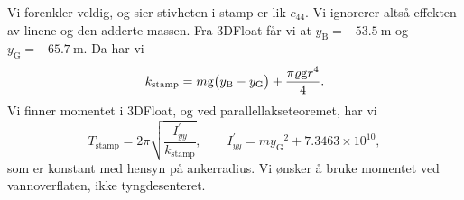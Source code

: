 Vi forenkler veldig, og sier stivheten i stamp er lik $c_{44}$.
Vi ignorerer altså effekten av linene og den adderte massen.
Fra 3DFloat får vi at $y_{\mathrm{B}} = \SI{-53.5}{\meter}$ og $y_{\mathrm{G}} = \SI{-65.7}{\meter}$.
Da har vi
\[
k_{\mathrm{stamp}} = m\mathrm{g} \big( y_{\mathrm{B}} - y_{\mathrm{G}} \big) + \frac{\pi\varrho\mathrm{g} r^4}{4}.
\]
Vi finner momentet i 3DFloat, og ved parallellakseteoremet, har vi
\[
T_{\mathrm{stamp}} = 2\pi\sqrt{\frac{I_{yy}^{\prime}}{k_{\mathrm{stamp}}}}, \qquad I_{yy}^{\prime} = m {y_{\mathrm{G}}}^2 + 7.3463\times10^{10},
\]
som er konstant med hensyn på ankerradius.
Vi ønsker å bruke momentet ved vannoverflaten, ikke tyngdesenteret.
